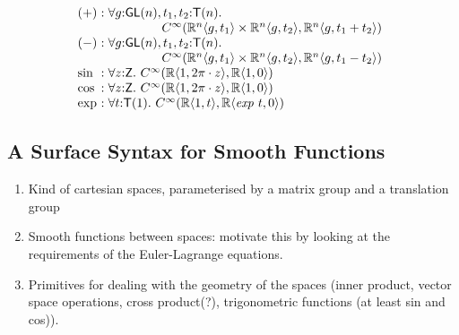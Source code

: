 \documentclass[preprint]{sigplanconf}
\theoremstyle{examplestyle}
\begin{document}
\begin{displaymath}
  \begin{array}{l@{\hspace{0.3em}}c@{\hspace{0.3em}}l}
    (+) &:&
    \begin{array}[t]{@{}l}
      \forall g \mathord: \mathsf{GL}(n), t_1,t_2 \mathord: \mathsf{T}(n). \\
      \hspace{1.5cm} C^\infty(\mathbb{R}^n\langle g, t_1 \rangle \times \mathbb{R}^n\langle g, t_2 \rangle, \mathbb{R}^n\langle g, t_1 + t_2 \rangle)\\
    \end{array} \\
    (-) &:&
    \begin{array}[t]{@{}l}
      \forall g \mathord: \mathsf{GL}(n), t_1,t_2 \mathord: \mathsf{T}(n). \\
      \hspace{1.5cm} C^\infty(\mathbb{R}^n\langle g, t_1 \rangle \times \mathbb{R}^n\langle g, t_2 \rangle, \mathbb{R}^n\langle g, t_1 - t_2 \rangle)\\
    \end{array} \\
    \sin &:& \forall z \mathord: \mathsf{Z}.~C^\infty(\mathbb{R}\langle 1, 2\pi \cdot z \rangle, \mathbb{R} \langle 1, 0 \rangle) \\
    \cos &:& \forall z \mathord: \mathsf{Z}.~C^\infty(\mathbb{R}\langle 1, 2\pi \cdot z \rangle, \mathbb{R} \langle 1, 0 \rangle) \\
    \mathrm{exp} &:& \forall t \mathord: \mathsf{T}(1).~C^\infty(\mathbb{R}\langle 1, t \rangle, \mathbb{R}\langle \mathit{exp}~t, 0 \rangle)
  \end{array}
\end{displaymath}

\subsection{A Surface Syntax for Smooth Functions}
\label{sec:surface-syntax}

\begin{enumerate}
\item Kind of cartesian spaces, parameterised by a matrix group and a
  translation group
\item Smooth functions between spaces: motivate this by looking at the
  requirements of the Euler-Lagrange equations.
\item Primitives for dealing with the geometry of the spaces (inner
  product, vector space operations, cross product(?), trigonometric
  functions (at least sin and cos)).
\end{enumerate}
\end{document}
